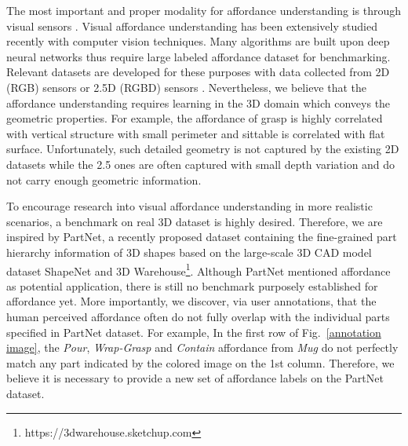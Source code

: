 \documentclass[final]{cvpr}
\begin{document}
The most important and proper modality for affordance understanding is through visual sensors \cite{hassanin2018visual}. Visual affordance understanding has been extensively studied recently with computer vision techniques. Many algorithms are built upon deep neural networks \cite{nguyen2017object,do2018affordancenet,sawatzky2017weakly} thus require large labeled affordance dataset for benchmarking. Relevant datasets are developed for these purposes with data collected from 2D (RGB) sensors \cite{zhou2019semantic,song2015learning,roy2016multi} or 2.5D (RGBD) sensors \cite{myers2015affordance,nguyen2017object,sawatzky2017weakly}. Nevertheless, we believe that the affordance understanding requires learning in the 3D domain which conveys the geometric properties. For example, the affordance of grasp is highly correlated with vertical structure with small perimeter and sittable is correlated with flat surface. Unfortunately, such detailed geometry is not captured by the existing 2D datasets while the 2.5 ones \cite{nguyen2017object,sawatzky2017weakly} are often captured with small depth variation and do not carry enough geometric information.






To encourage research into visual affordance understanding in more realistic scenarios, a benchmark on real 3D dataset is highly desired. Therefore, we are inspired by PartNet\cite{mo2019partnet}, a recently proposed dataset containing the fine-grained part
hierarchy information of 3D shapes based on the large-scale 3D CAD model
dataset ShapeNet\cite{chang2015shapenet} and 3D Warehouse\footnote{https://3dwarehouse.sketchup.com}.
Although PartNet mentioned affordance as potential application, there is still no benchmark purposely established for affordance yet. More importantly, we discover, via user annotations, that the human perceived affordance often do not fully overlap with the individual parts specified in PartNet dataset. For example, In the first row of Fig.~\ref{annotation image}, the \textit{Pour}, \textit{Wrap-Grasp} and \textit{Contain} affordance from \textit{Mug} do not perfectly match any part indicated by the colored image on the 1st column. Therefore, we believe it is necessary to provide a new set of affordance labels on the PartNet dataset.
\end{document}

